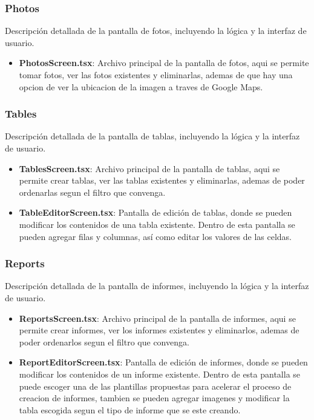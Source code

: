 \documentclass[a4paper,12pt]{article}
\begin{document}
\subsubsection{Photos}
Descripción detallada de la pantalla de fotos, incluyendo la lógica y la interfaz de usuario.
\begin{itemize}
    \item \textbf{PhotosScreen.tsx}: Archivo principal de la pantalla de fotos, aqui se permite tomar fotos, ver las fotos existentes y eliminarlas, ademas de que hay una opcion de ver la ubicacion de la imagen a traves de Google Maps. 
\end{itemize}

\subsubsection{Tables}
Descripción detallada de la pantalla de tablas, incluyendo la lógica y la interfaz de usuario.
\begin{itemize}
    \item \textbf{TablesScreen.tsx}: Archivo principal de la pantalla de tablas, aqui se permite crear tablas, ver las tablas existentes y eliminarlas, ademas de poder ordenarlas segun el filtro que convenga. 
    \item \textbf{TableEditorScreen.tsx}: Pantalla de edición de tablas, donde se pueden modificar los contenidos de una tabla existente. Dentro de esta pantalla se pueden agregar filas y columnas, así como editar los valores de las celdas.
\end{itemize}

\subsubsection{Reports}
Descripción detallada de la pantalla de informes, incluyendo la lógica y la interfaz de usuario.
\begin{itemize}
    \item \textbf{ReportsScreen.tsx}: Archivo principal de la pantalla de informes, aqui se permite crear informes, ver los informes existentes y eliminarlos, ademas de poder ordenarlos segun el filtro que convenga. 
    \item \textbf{ReportEditorScreen.tsx}: Pantalla de edición de informes, donde se pueden modificar los contenidos de un informe existente. Dentro de esta pantalla se puede escoger una de las plantillas propuestas para acelerar el proceso de creacion de informes, tambien se pueden agregar imagenes y modificar la tabla escogida segun el tipo de informe que se este creando.
\end{itemize}
\end{document}

